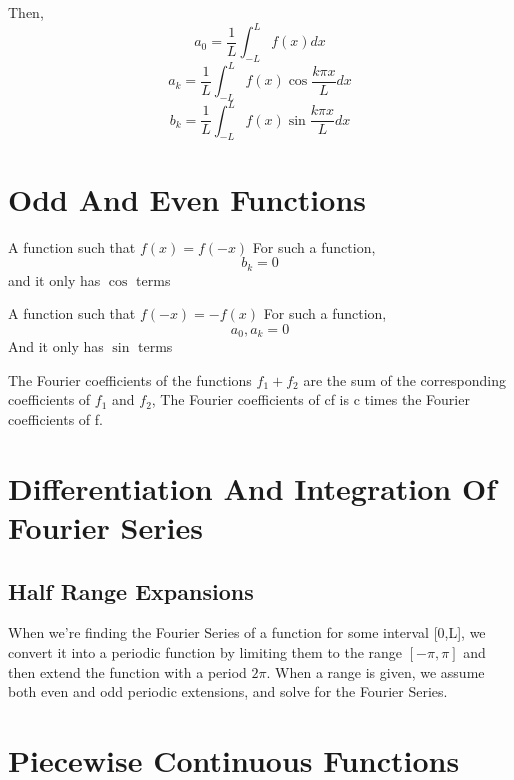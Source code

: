 \documentclass{article}
\begin{document}
Then, 
\[
     a_0 = \frac{1}{L} \int_{-L}^{L} f(x) dx
\]
\[
  a_k = \frac{1}{L} \int_{-L }^{L} f(x) \cos {\frac{k \pi x}{L}} dx  
\]
\[
 b_k = \frac{1}{L} \int_{-L }^{L} f(x) \sin {\frac{k \pi x}{L}} dx  
\] \section{Odd And Even Functions} %
\begin{definition}
   A function such that $f(x) = f(-x)$
   For such a function,
   \[
   	b_k = 0
   \]
   and it only has $\cos$ terms
   \label{dfn2}
\end{definition} %
\begin{definition}
   A function such that $f(-x) = -f(x)$
   For such a function,
   \[
   	a_0, a_k = 0
   \]
   And it only has $\sin$ terms
\end{definition}

\begin{theorem}
    The Fourier coefficients of the functions $f_1 + f_2$ are the sum of the corresponding coefficients of $f_1$ and $f_2$, The Fourier coefficients of cf is c times the Fourier coefficients of f.

\end{theorem}

\section{Differentiation And Integration Of Fourier Series}

\subsection{Half Range Expansions}
When we're finding the Fourier Series of a function for some interval [0,L], we convert it into a periodic function by limiting them to the range $[-\pi,\pi]$ and then extend the function with a period $2\pi$.
When a range is given, we assume both even and odd periodic extensions, and solve for the Fourier Series.
\section{Piecewise Continuous Functions}
\end{document}
